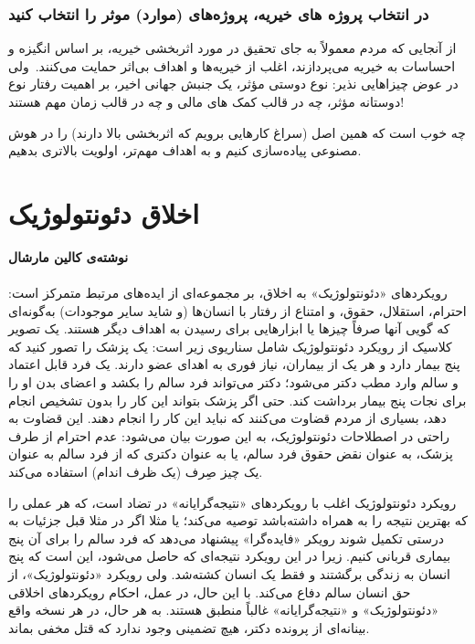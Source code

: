 \subsubsection*{در انتخاب پروژه های خیریه، پروژه‌های (موارد) موثر را انتخاب کنید}
\label{subsubsec:در انتخاب پروژه های خیریه، پروژه‌های (موارد) موثر را انتخاب کنید}
از آنجایی که مردم معمولاً به جای تحقیق در مورد اثربخشی خیریه، بر اساس انگیزه و احساسات به خیریه می‌پردازند، اغلب از خیریه‌ها و اهداف بی‌اثر حمایت می‌کنند.\     ولی در عوض چیزاهایی نذیر: نوع دوستی مؤثر، یک جنبش جهانی اخیر، بر اهمیت رفتار نوع دوستانه مؤثر، چه در قالب کمک های مالی و چه در قالب زمان مهم هستند!

چه خوب است که همین اصل (سراغ کارهایی برویم که اثربخشی بالا دارند) را در هوش مصنوعی پیاده‌سازی کنیم و به اهداف مهم‌تر، اولویت بالاتری بدهیم.


\section*{اخلاق دئونتولوژیک}
\label{sec:اخلاق دئونتولوژیک}
\textbf{نوشته‌ی کالین مارشال}
\paragraph{}
رویکردهای «دئونتولوژیک» به اخلاق، بر مجموعه‌ای از ایده‌های مرتبط متمرکز است: احترام، استقلال، حقوق، و امتناع از رفتار با انسان‌ها (و شاید سایر موجودات) به‌گونه‌ای که گویی آنها صرفاً چیزها یا ابزارهایی برای رسیدن به اهداف دیگر هستند.
یک تصویر کلاسیک از رویکرد دئونتولوژیک شامل سناریوی زیر است: یک پزشک را تصور کنید که پنج بیمار دارد و هر یک از بیماران، نیاز فوری به اهدای عضو دارند.
یک فرد قابل اعتماد و سالم وارد مطب دکتر می‌شود؛ دکتر می‌تواند فرد سالم را بکشد و اعضای بدن او را برای نجات پنج بیمار برداشت کند.
حتی اگر پزشک بتواند این کار را بدون تشخیص انجام دهد، بسیاری از مردم قضاوت می‌کنند که نباید این کار را انجام دهند.
این قضاوت به راحتی در اصطلاحات دئونتولوژیک، به این صورت بیان می‌شود: عدم احترام از طرف پزشک، به عنوان نقض حقوق فرد سالم، یا به عنوان دکتری که از فرد سالم به عنوان یک چیز صِرف (یک ظرف اندام) استفاده می‌کند.

رویکرد دئونتولوژیک اغلب با رویکردهای «نتیجه‌گرایانه» در تضاد است، که هر عملی را که بهترین نتیجه را به همراه داشته‌باشد توصیه می‌کند؛ یا مثلا اگر در مثلا قبل جزئیات به درستی تکمیل شوند رویکر «فایده‌گرا» پیشنهاد می‌دهد که فرد سالم را برای آن پنج بیماری قربانی کنیم.
زیرا در این رویکرد نتیجه‌ای که حاصل می‌شود، این است که پنج انسان به زندگی برگشتند و فقط یک انسان کشته‌شد.
ولی رویکرد «دئونتولوژیک»، از حق انسان سالم دفاع می‌کند.
با این حال، در عمل، احکام رویکردهای اخلاقی «دئونتولوژیک» و «نتیجه‌گرایانه» غالباً منطبق هستند.
به هر حال، در هر نسخه واقع بینانه‌ای از پرونده دکتر، هیچ تضمینی وجود ندارد که قتل مخفی بماند.

